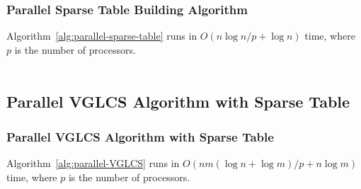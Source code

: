 \begin{withoutheadline}
\begin{frame}
	\frametitle{Parallel Sparse Table Building Algorithm}
	Algorithm~\ref{alg:parallel-sparse-table} runs in $O(n \log n / p
	+ \log n)$ time, where $p$ is the number of processors.
	\\~\\
	
\end{frame}
\end{withoutheadline}


\subsection{Parallel VGLCS Algorithm with Sparse Table}
\begin{withoutheadline}
\begin{frame}
	\frametitle{Parallel VGLCS Algorithm with Sparse Table}
	Algorithm~\ref{alg:parallel-VGLCS} runs in $O(n m (\log n + \log m)
	/ p + n \log m)$ time, where $p$ is the number of processors.
	\\~\\
	\begin{center}
		\scalebox{.7} { \begin{minipage}{1.4\textwidth}
			
			\end{minipage}
		}
	\end{center}
\end{frame}
\end{withoutheadline}